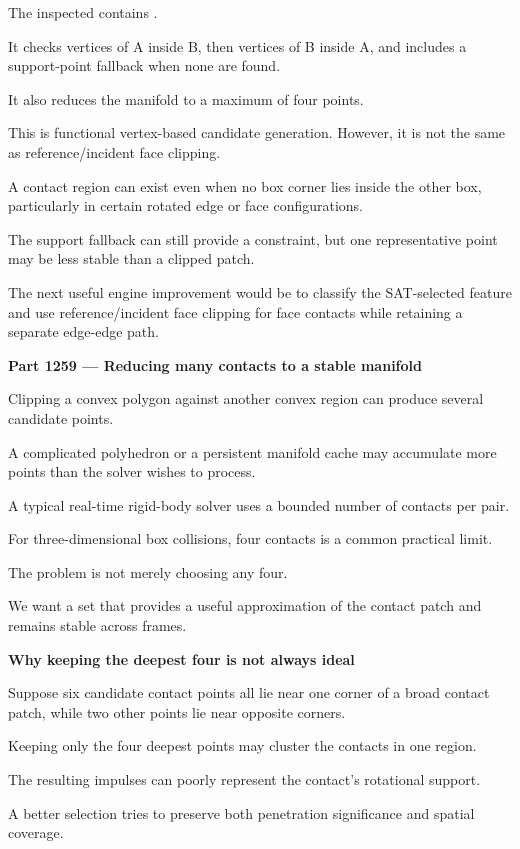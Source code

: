 The inspected  contains .

It checks vertices of A inside B, then vertices of B inside A, and includes a support-point fallback when none are found.

It also reduces the manifold to a maximum of four points.

This is functional vertex-based candidate generation. However, it is not the same as reference/incident face clipping.

A contact region can exist even when no box corner lies inside the other box, particularly in certain rotated edge or face configurations.

The support fallback can still provide a constraint, but one representative point may be less stable than a clipped patch.

The next useful engine improvement would be to classify the SAT-selected feature and use reference/incident face clipping for face contacts while retaining a separate edge-edge path.

\textbf{Part 1259 --- Reducing many contacts to a stable manifold}

Clipping a convex polygon against another convex region can produce several candidate points.

A complicated polyhedron or a persistent manifold cache may accumulate more points than the solver wishes to process.

A typical real-time rigid-body solver uses a bounded number of contacts per pair.

For three-dimensional box collisions, four contacts is a common practical limit.

The problem is not merely choosing any four.

We want a set that provides a useful approximation of the contact patch and remains stable across frames.

\textbf{Why keeping the deepest four is not always ideal}

Suppose six candidate contact points all lie near one corner of a broad contact patch, while two other points lie near opposite corners.

Keeping only the four deepest points may cluster the contacts in one region.

The resulting impulses can poorly represent the contact's rotational support.

A better selection tries to preserve both penetration significance and spatial coverage.

